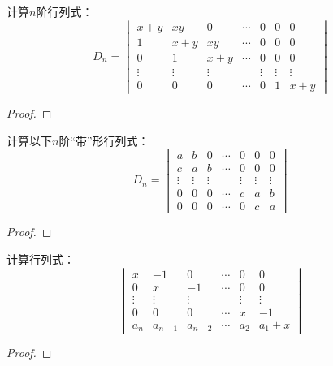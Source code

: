 \begin{problem}
计算\(n\)阶行列式：
\begin{equation*}
    D_n=
    \begin{vmatrix}
        x+y    & xy     & 0      & \cdots & 0      & 0      & 0      \\
        1      & x+y    & xy     & \cdots & 0      & 0      & 0      \\
        0      & 1      & x+y    & \cdots & 0      & 0      & 0      \\
        \vdots & \vdots & \vdots &        & \vdots & \vdots & \vdots \\
        0      & 0      & 0      & \cdots & 0      & 1      & x+y
    \end{vmatrix}
\end{equation*}
\end{problem}
\begin{proof}
\end{proof}

\begin{problem}
计算以下\(n\)阶“带”形行列式：
\begin{equation*}
    D_n=
    \begin{vmatrix}
        a      & b      & 0      & \cdots & 0      & 0      & 0      \\
        c      & a      & b      & \cdots & 0      & 0      & 0      \\
        \vdots & \vdots & \vdots &        & \vdots & \vdots & \vdots \\
        0      & 0      & 0      & \cdots & c      & a      & b      \\
        0      & 0      & 0      & \cdots & 0      & c      & a
    \end{vmatrix}
\end{equation*}
\end{problem}
\begin{proof}
\end{proof}

\begin{problem}
计算行列式：
\begin{equation*}
    \begin{vmatrix}
        x      & -1      & 0       & \cdots & 0      & 0      \\
        0      & x       & -1      & \cdots & 0      & 0      \\
        \vdots & \vdots  & \vdots  &        & \vdots & \vdots \\
        0      & 0       & 0       & \cdots & x      & -1     \\
        a_n    & a_{n-1} & a_{n-2} & \cdots & a_2    & a_1+x
    \end{vmatrix}
\end{equation*}
\end{problem}
\begin{proof}

\end{proof}

